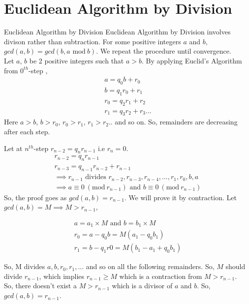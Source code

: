 \documentclass[8pt]{beamer}
\begin{document}
\section{Euclidean Algorithm by Division}
\begin{frame}[allowframebreaks]{Euclidean Algorithm by Division}
Euclidean Algorithm by Division involves divison rather than subtraction. For some positive integers $a$ and $b$, $gcd(a, b) = gcd(b, a \textrm{ mod}\ b)$. We repeat the procedure until convergence.\\

 Let $a$, $b$ be 2 positive integers such that $a > b$. By applying Euclid's Algorithm from $0^{th}$-step ,
 \begin{align}
     a = q_{0}b + r_{0}\label{eq:ED1}\\
     b = q_{1}r_{0} + r_{1}\\
     r_{0} = q_{2}r_{1} + r_{2}\\
     r_{1} = q_{3}r_{2} + r_{3}...
 \end{align}
 Here $a > b$, $ b > r_{0}$, $r_{0} > r_{1}$, $r_{1} > r_{2}$.. and so on. So, remainders are decreasing after each step.
 
 \framebreak
 
 Let at $n^{th}$-step $r_{n-2} = q_{n}r_{n-1}$ i.e $r_{n} = 0$.
 \begin{align}
    r_{n-2} = q_{n}r_{n-1}\label{eq:ED2}\\
    r_{n-3} = q_{n-1}r_{n-2} + r_{n-1}\\
    \implies r_{n-1} \text{ divides } r_{n-2}, r_{n-3}, r_{n-4},..., r_{1}, r_{0}, b, a\\
    \implies a \equiv 0\ (\textrm{mod}\ r_{n-1}) \text{ and } b \equiv 0\ (\textrm{mod}\ r_{n-1})
\end{align}
So, the proof goes as $gcd(a,b) = r_{n-1}$. We will prove it by contraction. Let  $gcd(a,b) = M \implies M > r_{n-1}$,

\begin{align}
    a = a_{1} \times M \text{ and } b = b_{1} \times M\\
    r_{0} = a - q_{0}b = M(a_{1} - q_{0}b_{1})\\
    r_{1} = b - q_{1}r{0} = M(b_{1} - a_{1} + q_{0}b_{1})
\end{align}

\framebreak

So, M divides $a, b, r_{0}, r_{1}, ... $ and so on all the following remainders. So, $M$ should divide $r_{n-1}$, which implies $r_{n-1} \geq M$ which is a contraction from $M > r_{n-1}$.\\
\vspace{0.2in}
So, there doesn't exist a $M > r_{n-1}$ which is a divisor of $a$ and $b$. So, $gcd(a,b)  = r_{n-1}$.
\end{frame}
\end{document}
